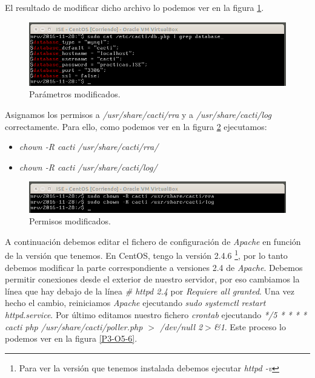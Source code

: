 \documentclass[a4paper,titlepage,12pt]{report}	%
\numberwithin{figure}{section} %
\numberwithin{table}{section} %
\begin{document}
	El resultado de modificar dicho archivo lo podemos ver en la figura \ref{P3-O5-4}.

	\begin{figure}[H]
	   \includegraphics[width=\linewidth]{./Imagenes/P3/O5-4.png}
	   \vspace{-0.5cm}
	   \caption[Parámetros modificados.]{Parámetros modificados.}
	   \label{P3-O5-4}
	\end{figure}

	Asignamos los permisos a \textit{/usr/share/cacti/rra} y a \textit{/usr/share/cacti/log} correctamente. Para ello, como podemos ver en la figura \ref{P3-O5-5} ejecutamos:
	\begin{itemize}
	   \item \textit{chown -R cacti /usr/share/cacti/rra/}
	   \item \textit{chown -R cacti /usr/share/cacti/log/}
	\end{itemize}

	\begin{figure}[H]
	   \includegraphics[width=\linewidth]{./Imagenes/P3/O5-5.png}
	   \vspace{-0.5cm}
	   \caption[Permisos modificados.]{Permisos modificados.}
	   \label{P3-O5-5}
	\end{figure}

	A continuación debemos editar el fichero de configuración de \textit{Apache} en función de la versión que tenemos. En CentOS, tengo la versión 2.4.6 \footnote{Para ver la versión que tenemos instalada debemos ejecutar \textit{httpd -v}}, por lo tanto debemos modificar la parte correspondiente a versiones 2.4 de \textit{Apache}. Debemos permitir conexiones desde el exterior de nuestro servidor, por eso cambiamos la línea que hay debajo de la línea \textit{\# httpd 2.4} por \textit{Requiere all granted}. Una vez hecho el cambio, reiniciamos \textit{Apache} ejecutando \textit{sudo systemctl restart httpd.service}. Por último editamos nuestro fichero \textit{crontab} ejecutando \textit{*/5 * * * * cacti php /usr/share/cacti/poller.php $>$ /dev/null 2$>$\&1}. Este proceso lo podemos ver en la figura \ref{P3-O5-6}.
\end{document}
